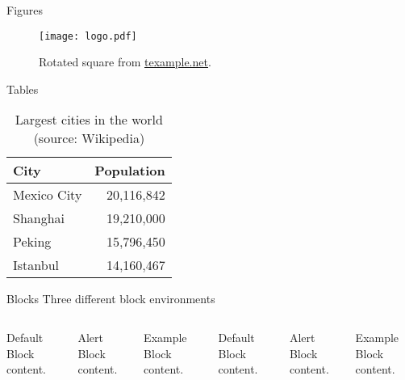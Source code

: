 \documentclass[10pt]{beamer}
\begin{document}
\begin{frame}{Figures}
  \begin{figure}
  \texttt{[image: logo.pdf]}
    \caption{Rotated square from
    \href{http://www.texample.net/tikz/examples/rotated-polygons/}{texample.net}.}
  \end{figure}
\end{frame}


\begin{frame}{Tables}
  \begin{table}

    \begin{tabular}{@{} lr @{}}
      \toprule
      City & Population\\
      \midrule
      Mexico City & 20,116,842\\
      Shanghai & 19,210,000\\
      Peking & 15,796,450\\
      Istanbul & 14,160,467\\
      \bottomrule
    \end{tabular}
        \caption{Largest cities in the world (source: Wikipedia)}
  \end{table}
\end{frame}


\begin{frame}{Blocks}
  Three different block environments
  \begin{columns}[T,onlytextwidth]
      \begin{block}{Default}
        Block content.
      \end{block}
      \begin{alertblock}{Alert}
        Block content.
      \end{alertblock}
      \begin{exampleblock}{Example}
        Block content.
      \end{exampleblock}

      \begin{block}{Default}
        Block content.
      \end{block}
      \begin{alertblock}{Alert}
        Block content.
      \end{alertblock}
      \begin{exampleblock}{Example}
        Block content.
      \end{exampleblock}
  \end{columns}
\end{frame}
\end{document}
